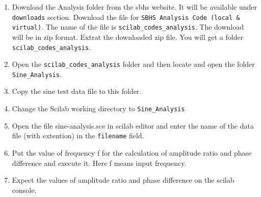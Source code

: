 \begin{enumerate}
\item Download the Analysis folder from the sbhs website. It will be available under {\tt downloads} section.  Download the file for {\tt SBHS Analysis Code (local \& virtual)}. The name of the file is {\tt scilab\_codes\_analysis}. The download will be in zip format. Extrat the downloaded zip file. You will get a folder {\tt scilab\_codes\_analysis}. 
\item Open the {\tt scilab\_codes\_analysis} folder and then locate and open the folder {\tt Sine\_Analysis}.
 \item Copy the sine test data file to this folder.
 \item Change the Scilab working directory to  {\tt Sine\_Analysis}
 \item Open the file {\ttfamily sine-analysis.sce} in scilab editor and enter the name of the data file (with extention) in the {\tt filename} field.
\item Put the value of frequency {\ttfamily f} for the calculation of amplitude ratio and phase difference and execute it. Here {\ttfamily f} means input frequency.
\item Expect the values of amplitude ratio and phase difference on the scilab console.
\end{enumerate}

